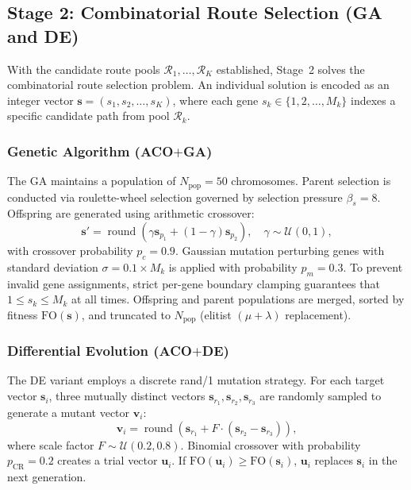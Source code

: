 \documentclass[journal]{IEEEtran}
\newcommand{\FO}{\mathrm{FO}}
\begin{document}
\subsection{Stage 2: Combinatorial Route Selection (GA and DE)}
With the candidate route pools $\mathcal{R}_1, \dots, \mathcal{R}_K$ established, Stage~2 solves the combinatorial route selection problem. An individual solution is encoded as an integer vector $\mathbf{s} = (s_1, s_2, \dots, s_K)$, where each gene $s_k \in \{1, 2, \dots, M_k\}$ indexes a specific candidate path from pool $\mathcal{R}_k$.

\subsubsection{Genetic Algorithm (ACO$+$GA)}
The GA maintains a population of $N_{\text{pop}} = 50$ chromosomes. Parent selection is conducted via roulette-wheel selection governed by selection pressure $\beta_s = 8$. Offspring are generated using arithmetic crossover:
\begin{equation}
\mathbf{s}' = \operatorname{round}\left( \gamma \mathbf{s}_{p_1} + (1 - \gamma)\mathbf{s}_{p_2} \right), \quad \gamma \sim \mathcal{U}(0, 1),
\end{equation}
with crossover probability $p_c = 0.9$. Gaussian mutation perturbing genes with standard deviation $\sigma = 0.1 \times M_k$ is applied with probability $p_m = 0.3$. To prevent invalid gene assignments, strict per-gene boundary clamping guarantees that $1 \le s_k \le M_k$ at all times. Offspring and parent populations are merged, sorted by fitness $\FO(\mathbf{s})$, and truncated to $N_{\text{pop}}$ (elitist $(\mu + \lambda)$ replacement).

\subsubsection{Differential Evolution (ACO$+$DE)}
The DE variant employs a discrete rand/1 mutation strategy. For each target vector $\mathbf{s}_i$, three mutually distinct vectors $\mathbf{s}_{r_1}, \mathbf{s}_{r_2}, \mathbf{s}_{r_3}$ are randomly sampled to generate a mutant vector $\mathbf{v}_i$:
\begin{equation}
\mathbf{v}_i = \operatorname{round}\left( \mathbf{s}_{r_1} + F \cdot (\mathbf{s}_{r_2} - \mathbf{s}_{r_3}) \right),
\end{equation}
where scale factor $F \sim \mathcal{U}(0.2, 0.8)$. Binomial crossover with probability $p_{\text{CR}} = 0.2$ creates a trial vector $\mathbf{u}_i$. If $\FO(\mathbf{u}_i) \ge \FO(\mathbf{s}_i)$, $\mathbf{u}_i$ replaces $\mathbf{s}_i$ in the next generation.
\end{document}
